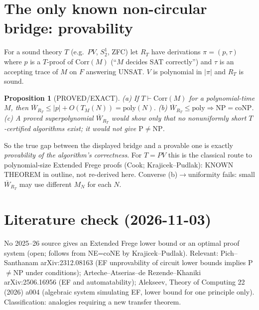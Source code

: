 \documentclass{article}
\newtheorem{prop}{Proposition}
\begin{document}
\section*{The only known non-circular bridge: provability}
For a sound theory $T$ (e.g.\ $PV$, $S^1_2$, ZFC) let $R_T$ have derivations $\pi=(p,\tau)$ where $p$ is a $T$-proof of $\mathrm{Corr}(M)$ (``$M$ decides SAT correctly'') and $\tau$ is an accepting trace of $M$ on $F$ answering UNSAT. $V$ is polynomial in $|\pi|$ and $R_T$ is sound.
\begin{prop}[PROVED/EXACT]
(a) If $T\vdash\mathrm{Corr}(M)$ for a polynomial-time $M$, then $\overline W_{R_T}\le |p|+O(T_M(N))=\mathrm{poly}(N)$. (b) $\overline W_{R_T}\le\mathrm{poly}\Rightarrow \mathrm{NP}=\mathrm{coNP}$. (c) A proved superpolynomial $\overline W_{R_T}$ would show only that no \emph{nonuniformly short} $T$-certified algorithms exist; it would not give $\mathrm P\neq\mathrm{NP}$.
\end{prop}
So the true gap between the displayed bridge and a provable one is exactly \emph{provability of the algorithm's correctness}. For $T=PV$ this is the classical route to polynomial-size Extended Frege proofs (Cook; Krajicek--Pudlak): KNOWN THEOREM in outline, not re-derived here. Converse (b)$\to$uniformity fails: small $\overline W_{R_T}$ may use different $M_N$ for each $N$.

\section*{Literature check (2026-11-03)}
No 2025--26 source gives an Extended Frege lower bound or an optimal proof system (open; follows from NE=coNE by Krajicek--Pudlak). Relevant: Pich--Santhanam arXiv:2312.08163 (EF unprovability of circuit lower bounds implies P$\ne$NP under conditions); Arteche--Atserias--de Rezende--Khaniki arXiv:2506.16956 (EF and automatability); Alekseev, Theory of Computing 22 (2026) a004 (algebraic system simulating EF, lower bound for one principle only). Classification: analogies requiring a new transfer theorem.
\end{document}
